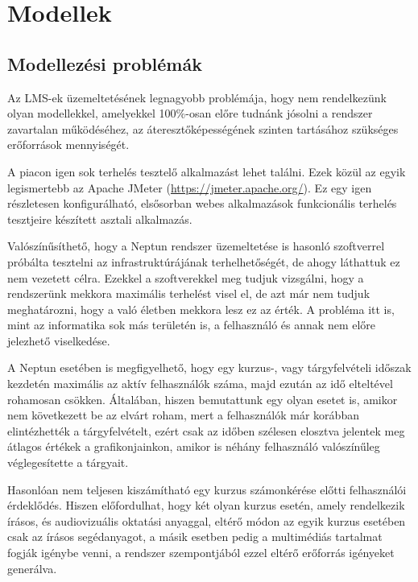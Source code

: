 \section{Modellek}

\subsection{Modellezési problémák}

Az LMS-ek üzemeltetésének legnagyobb problémája, hogy nem rendelkezünk olyan modellekkel, amelyekkel 100\%-osan előre tudnánk jósolni a rendszer zavartalan működéséhez, az áteresztőképességének szinten tartásához szükséges erőforrások mennyiségét.

A piacon igen sok terhelés tesztelő alkalmazást lehet találni. Ezek közül az egyik legismertebb az Apache JMeter (\href{https://jmeter.apache.org/}{https://jmeter.apache.org/}). Ez egy igen részletesen konfigurálható, elsősorban webes alkalmazások funkcionális terhelés tesztjeire készített asztali alkalmazás.

Valószínűsíthető, hogy a Neptun rendszer üzemeltetése is hasonló szoftverrel próbálta tesztelni az infrastruktúrájának terhelhetőségét, de ahogy láthattuk ez nem vezetett célra. Ezekkel a szoftverekkel meg tudjuk vizsgálni, hogy a rendszerünk mekkora maximális terhelést visel el, de azt már nem tudjuk meghatározni, hogy a való életben mekkora lesz ez az érték. A probléma itt is, mint az informatika sok más területén is, a felhasználó és annak nem előre jelezhető viselkedése.

A Neptun esetében is megfigyelhető, hogy egy kurzus-, vagy tárgyfelvételi időszak kezdetén maximális az aktív felhasználók száma, majd ezután az idő elteltével rohamosan csökken. Általában, hiszen bemutattunk egy olyan esetet is, amikor nem következett be az elvárt roham, mert a felhasználók már korábban elintézhették a tárgyfelvételt, ezért csak az időben szélesen elosztva jelentek meg átlagos értékek a grafikonjainkon, amikor is néhány felhasználó valószínűleg véglegesítette a tárgyait.

Hasonlóan nem teljesen kiszámítható egy kurzus számonkérése előtti felhasználói érdeklődés. Hiszen előfordulhat, hogy két olyan kurzus esetén, amely rendelkezik írásos, és audiovizuális oktatási anyaggal, eltérő módon az egyik kurzus esetében csak az írásos segédanyagot, a másik esetben pedig a multimédiás tartalmat fogják igénybe venni, a rendszer szempontjából ezzel eltérő erőforrás igényeket generálva.

